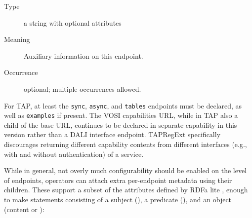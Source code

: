 \documentclass{ivoa}
\begin{document}
\begin{generated}
\begin{bigdescription}
\begin{description}
\end{description}
\item[Element \xmlel{meta}]
\begin{description}
\item[Type] a string with optional attributes
\item[Meaning] Auxiliary information on this endpoint.
\item[Occurrence] optional; multiple occurrences allowed.

\end{description}


\end{bigdescription}\endgroup

\endgroup
\end{generated}


For TAP, at least the \verb|sync|, \verb|async|, and \verb|tables|
endpoints must be declared, as well as \verb|examples| if present.  The VOSI
capabilities URL, while in TAP also a child of the base URL,
continues to be declared in separate capability in this version rather
than a DALI interface endpoint.  TAPRegExt specifically discourages
returning different capability contents from different interfaces (e.g.,
with and without authentication) of a service.

While in general, not overly much configurability should be enabled on
the level of endpoints, operators can attach extra per-endpoint metadata
using their  children.  These support a subset of
the attributes defined by RDFa lite \citep{std:RDFaLite11}, enough to
make statements consisting of a subject (), a predicate
(), and an object (content or ):
\end{document}
